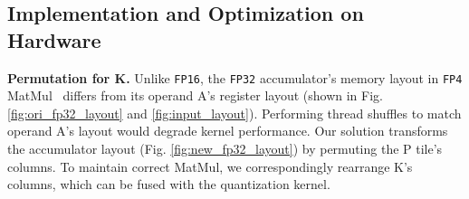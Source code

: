 









\subsection{Implementation and Optimization on Hardware}  \label{sec:hardware_implement}

\textbf{Permutation for K.}
Unlike \texttt{FP16}, the \texttt{FP32} accumulator's memory layout in \texttt{FP4} MatMul~\citep{nvidia2024ptx} differs from its operand A's register layout (shown in Fig. \ref{fig:ori_fp32_layout} and \ref{fig:input_layout}). Performing thread shuffles to match operand A's layout would degrade kernel performance.
Our solution transforms the accumulator layout (Fig. \ref{fig:new_fp32_layout}) by permuting the P tile's columns. To maintain correct MatMul, we correspondingly rearrange K's columns, which can be fused with the quantization kernel.


